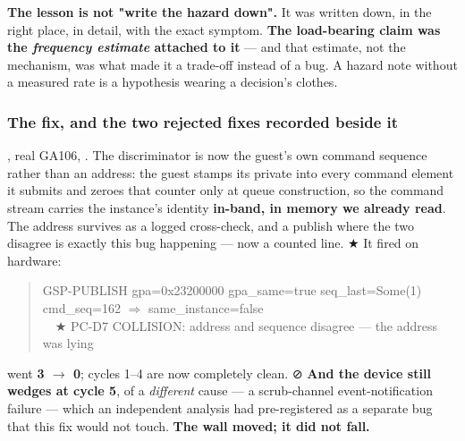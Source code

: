 \documentclass[10.5pt]{article}
\begin{document}
\begin{claimbox}\small
\textbf{The lesson is not "write the hazard down".} It was written down, in the right place, in
detail, with the exact symptom. \textbf{The load-bearing claim was the \emph{frequency estimate}
attached to it} --- and that estimate, not the mechanism, was what made it a trade-off instead of
a bug. A hazard note without a measured rate is a hypothesis wearing a decision's clothes.
\end{claimbox}

\subsubsection*{The fix, and the two rejected fixes recorded beside it}

\measured{} , real GA106, . The discriminator is now the guest's own
command sequence rather than an address: the guest stamps its private  into every
command element it submits and zeroes that counter only at queue construction, so the command
stream carries the instance's identity \textbf{in-band, in memory we already read}. The
address survives as a logged cross-check, and a publish where the two disagree is exactly this
bug happening --- now a counted line. ★ It fired on hardware:

\begin{quote}\small\ttfamily
GSP-PUBLISH gpa=0x23200000 gpa\_same=true seq\_last=Some(1) cmd\_seq=162 $\Rightarrow$ same\_instance=false\\
\ \ ★ PC-D7 COLLISION: address and sequence disagree --- the address was lying
\end{quote}

 went \textbf{3 $\to$ 0}; cycles 1--4 are now completely clean.
⊘ \textbf{And the device still wedges at cycle 5}, of a \emph{different} cause --- a scrub-channel
event-notification failure --- which an independent analysis had pre-registered as a separate bug
that this fix would not touch. \textbf{The wall moved; it did not fall.}
\end{document}
